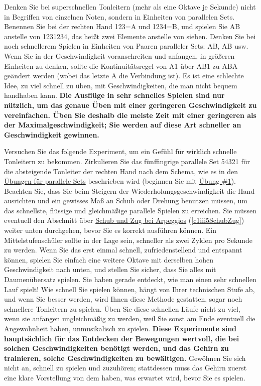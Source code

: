 Denken Sie bei superschnellen Tonleitern (mehr als eine Oktave je Sekunde) nicht in Begriffen von einzelnen Noten, sondern in Einheiten von parallelen Sets.
Benennen Sie bei der rechten Hand 123=A und 1234=B, und spielen Sie AB anstelle von 1231234, das heißt zwei Elemente anstelle von sieben.
Denken Sie bei noch schnellerem Spielen in Einheiten von Paaren paralleler Sets: AB, AB usw.
Wenn Sie in der Geschwindigkeit voranschreiten und anfangen, in größeren Einheiten zu denken, sollte die Kontinuitätsregel von A1 über AB1 zu ABA geändert werden (wobei das letzte A die Verbindung ist).
Es ist eine schlechte Idee, zu viel schnell zu üben, mit Geschwindigkeiten, die man nicht bequem handhaben kann.
\textbf{Die Ausflüge in sehr schnelles Spielen sind nur nützlich, um das genaue Üben mit einer geringeren Geschwindigkeit zu vereinfachen.
Üben Sie deshalb die meiste Zeit mit einer geringeren als der Maximalgeschwindigkeit; Sie werden auf diese Art schneller an Geschwindigkeit gewinnen.}

Versuchen Sie das folgende Experiment, um ein Gefühl für wirklich schnelle Tonleitern zu bekommen.
Zirkulieren Sie das fünffingrige parallele Set 54321 für die absteigende Tonleiter der rechten Hand nach dem Schema, wie es in den \hyperref[c1iii7b]{Übungen für parallele Sets} beschrieben wird (beginnen Sie mit \hyperref[c1iii7b1]{Übung \#1}).
Beachten Sie, dass Sie beim Steigern der Wiederholungsgeschwindigkeit die Hand ausrichten und ein gewisses Maß an Schub oder Drehung benutzen müssen, um das schnellste, flüssige und gleichmäßige parallele Spielen zu erreichen.
Sie müssen eventuell den Abschnitt über \hyperref[c1iii5SchubZug]{Schub und Zug bei Arpeggios} (\autoref{c1iii5SchubZug}) weiter unten durchgehen, bevor Sie es korrekt ausführen können.
Ein Mittelstufenschüler sollte in der Lage sein, schneller als zwei Zyklen pro Sekunde zu werden.
Wenn Sie das erst einmal schnell, zufriedenstellend und entspannt können, spielen Sie einfach eine weitere Oktave mit derselben hohen Geschwindigkeit nach unten, und stellen Sie sicher, dass Sie alles mit Daumenübersatz spielen.
Sie haben gerade entdeckt, wie man einen sehr schnellen Lauf spielt!
Wie schnell Sie spielen können, hängt von Ihrer technischen Stufe ab, und wenn Sie besser werden, wird Ihnen diese Methode gestatten, sogar noch schnellere Tonleitern zu spielen.
Üben Sie diese schnellen Läufe nicht zu viel, wenn sie anfangen ungleichmäßig zu werden, weil Sie sonst am Ende eventuell die Angewohnheit haben, unmusikalisch zu spielen.
\textbf{Diese Experimente sind hauptsächlich für das Entdecken der Bewegungen wertvoll, die bei solchen Geschwindigkeiten benötigt werden, und das Gehirn zu trainieren, solche Geschwindigkeiten zu bewältigen.}
Gewöhnen Sie sich nicht an, schnell zu spielen und zuzuhören; stattdessen muss das Gehirn zuerst eine klare Vorstellung von dem haben, was erwartet wird, bevor Sie es spielen.

